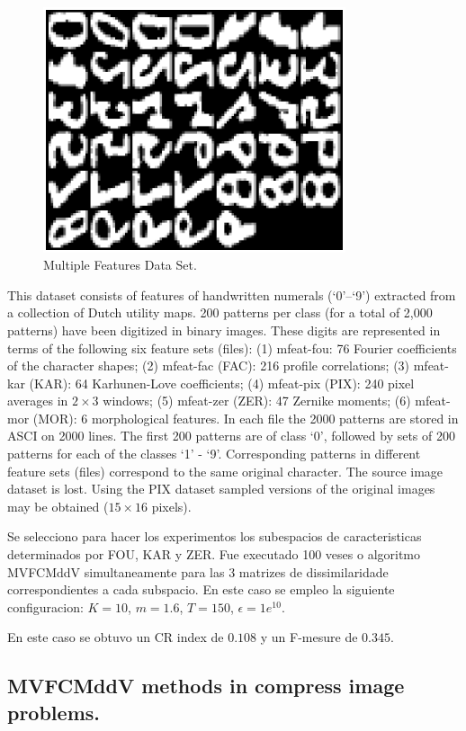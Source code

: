 \documentclass[12pt]{article}
\begin{document}
\begin{figure}[h]
\centering
\includegraphics[width=3.5in]{../out/data-base.eps}
\caption{Multiple Features Data Set.}
\label{fig:data_base}
\end{figure}  

This dataset consists of features of handwritten numerals (`0'--`9') extracted from a collection of Dutch utility maps. 200 patterns per class (for a total of 2,000 patterns) have been digitized in binary images. These digits are represented in terms of the following six feature sets (files): (1) mfeat-fou: 76 Fourier coefficients of the character shapes; (2) mfeat-fac (FAC): 216 profile correlations; (3) mfeat-kar (KAR): 64 Karhunen-Love coefficients; (4) mfeat-pix (PIX): 240 pixel averages in $2 \times 3$ windows; (5) mfeat-zer (ZER): 47 Zernike moments; (6) mfeat-mor (MOR): 6 morphological features. In each file the 2000 patterns are stored in ASCI on 2000 lines. The first 200 patterns are of class `0', followed by sets of 200 patterns for each of the classes `1' - `9'. Corresponding patterns in different feature sets (files) correspond to the same original character. The source image dataset is lost. Using the PIX dataset sampled versions of the original images may be obtained ($15 \times 16$ pixels).

Se selecciono para hacer los experimentos los subespacios de caracteristicas determinados por FOU, KAR y ZER. Fue executado 100 veses o algoritmo MVFCMddV simultaneamente para las 3 matrizes de dissimilaridade correspondientes a cada subspacio. En este caso se empleo la siguiente configuracion: $K =10$, $m = 1.6$, $T = 150$, $\epsilon = 1e^{10}$.

En este caso se obtuvo un CR index de $0.108$ y un F-mesure de $0.345$. 




\subsection{MVFCMddV methods in compress image problems.}
\end{document}
